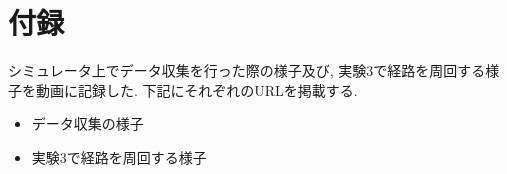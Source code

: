 \chapter*{付録}
シミュレータ上でデータ収集を行った際の様子及び, 実験3で経路を周回する様子を動画に記録した. 下記にそれぞれのURLを掲載する.
\begin{itemize}
  \item データ収集の様子
  \item 実験3で経路を周回する様子
\end{itemize}
